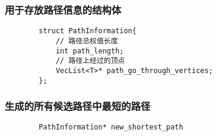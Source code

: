 \subsubsection{用于存放路径信息的结构体}
    \begin{lstlisting}
        struct PathInformation{
            // 路径总权值长度
            int path_length;
            // 路径上经过的顶点
            VecList<T>* path_go_through_vertices;
        };
    \end{lstlisting}

\subsubsection{生成的所有候选路径中最短的路径}
    \begin{lstlisting}
        PathInformation* new_shortest_path
    \end{lstlisting}
